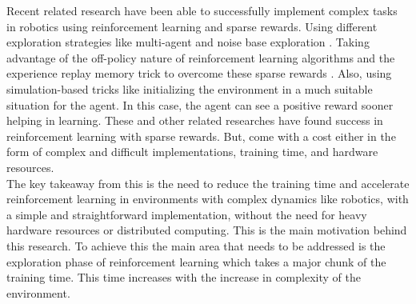 Recent related research \cite{plappert2018multigoal} have been able to successfully implement complex tasks in robotics using reinforcement learning and sparse rewards. Using different exploration strategies like multi-agent and noise base exploration \cite{lanier2019curiositydriven}. Taking advantage of the off-policy nature of reinforcement learning algorithms and the experience replay memory trick to overcome these sparse rewards \cite{andrychowicz2018hindsight}. Also, using simulation-based tricks like initializing the environment in a much suitable situation for the agent. In this case, the agent can see a positive reward sooner helping in learning. These and other related researches have found success in reinforcement learning with sparse rewards. But, come with a cost either in the form of complex and difficult implementations, training time, and hardware resources. \\

The key takeaway from this is the need to reduce the training time and accelerate reinforcement learning in environments with complex dynamics like robotics, with a simple and straightforward implementation, without the need for heavy hardware resources or distributed computing. This is the main motivation behind this research. To achieve this the main area that needs to be addressed is the exploration phase of reinforcement learning which takes a major chunk of the training time. This time increases with the increase in complexity of the environment. \\

